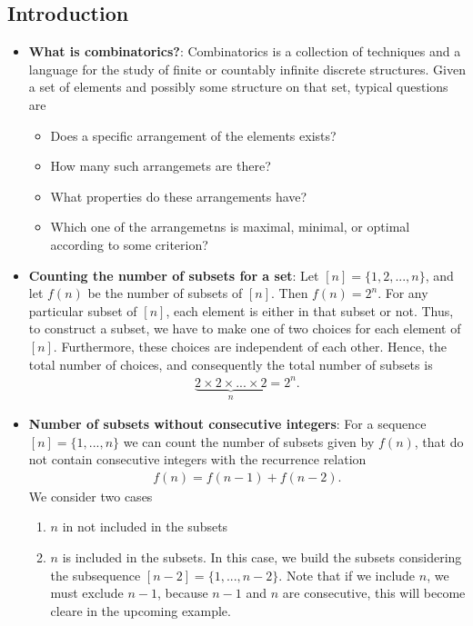 \documentclass{report}
\begin{document}
    \pagebreak 
    \bigbreak \noindent 
    \subsection{Introduction}
    \begin{itemize}
        \item \textbf{What is combinatorics?}: Combinatorics is a collection of techniques and a language for the study of finite or countably infinite discrete structures. Given a set of elements and possibly some structure on that set, typical questions are
            \begin{itemize}
                \item Does a specific arrangement of the elements exists?
                \item How many such arrangemets are there?
                \item What properties do these arrangements have?
                \item Which one of the arrangemetns is maximal, minimal, or optimal according to some criterion?
            \end{itemize}
        \item \textbf{Counting the number of subsets for a set}: Let $[n] = \{1,2,...,n\} $, and let $f(n)$ be the number of subsets of $[n]$. Then $f(n) = 2^{n}$. For any particular subset of $[n]$, each element is either in that subset or not. Thus, to construct a subset, we have to make one of two choices for each element of $[n]$. Furthermore, these choices are independent of each other. Hence, the total number of choices, and consequently the total number of subsets is 
            \begin{align*}
                \underbrace{2\times2\times...\times2}_{n} = 2^{n}
            .\end{align*}
        \item \textbf{Number of subsets without consecutive integers}: For a sequence $[n] = \{1,...,n\}$ we can count the number of subsets given by $f(n)$, that do not contain consecutive integers with the recurrence relation
            \begin{align*}
                f(n) = f(n-1) + f(n-2)
            .\end{align*}
            We consider two cases
            \begin{enumerate}
                \item $n$ in not included in the subsets
                \item $n$ is included in the subsets. In this case, we build the subsets considering the subsequence $[n-2]  = \{1,...,n-2\}$. Note that if we include $n$, we must exclude $n-1$, because $n-1$ and $n$ are consecutive, this will become cleare in the upcoming example.

\end{enumerate}
\end{itemize}
\end{document}
